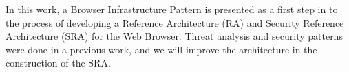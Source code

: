 \documentclass{sig-alternate-05-2015}
\begin{document}
In this work, a Browser Infrastructure Pattern is presented as a first step in to the process of developing a Reference Architecture (RA) and Security Reference Architecture (SRA) for the Web Browser. Threat analysis and security patterns were done in a previous work, and we will improve the architecture in the construction of the SRA.




\end{document}
